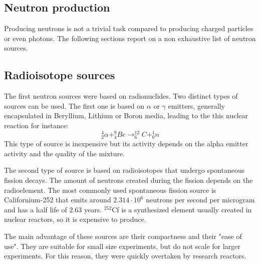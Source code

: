 \begin{refsection}
  \section{Neutron production}
  Producing neutrons is not a trivial task compared to producing charged particles or even photons. The following sections report on a non exhaustive list of neutron sources.

  \subsection{Radioisotope sources}
  The first neutron sources were based on radionuclides. Two distinct types of sources can be used. The first one is based on $\alpha$ or $\gamma$ emitters, generally encapsulated in Beryllium, Lithium or Boron media, leading to the this nuclear reaction for instance:
  \begin{equation*}
    _{2}^{4}\alpha + _{4}^{9}Be \rightarrow _{6}^{12}C + _{0}^{1}n
  \end{equation*}
  This type of source is inexpensive but its activity depends on the alpha emitter activity and the quality of the mixture.

  The second type of source is based on radioisotopes that undergo spontaneous fission decays. The amount of neutrons created during the fission depends on the radioelement. The most commonly used spontaneous fission source is
  Californium-252 that emits around $2.314 \cdot 10^{6}$ neutrons per second per microgram and has a half life of $2.63$ years.
  $^{252}$Cf is a synthesized element usually created in nuclear reactors, so it is expensive to produce.

  The main advantage of these sources are their compactness and their "ease of use". They are suitable for small size experiments, but do not scale for larger experiments. For this reason, they were quickly overtaken by research reactors.


\end{refsection}
